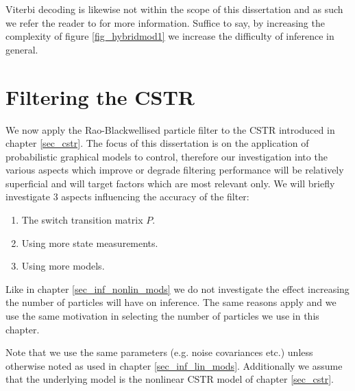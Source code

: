 Viterbi decoding is likewise not within the scope of this dissertation and as such we refer the reader to \cite{murphy1} for more information. Suffice to say, by increasing the complexity of figure \ref{fig_hybridmod1} we increase the difficulty of inference in general.

\section{Filtering the CSTR}
\label{sec_rbpf_filtering_cstr}
We now apply the Rao-Blackwellised particle filter to the CSTR introduced in chapter \ref{sec_cstr}. The focus of this dissertation is on the application of probabilistic graphical models to control, therefore our investigation into the various aspects which improve or degrade filtering performance will be relatively superficial and will target factors which are most relevant only. We will briefly investigate 3 aspects influencing the accuracy of the filter:
\begin{enumerate}
\item
The switch transition matrix $P$.
\item
Using more state measurements.
\item
Using more models.
\end{enumerate}
Like in chapter \ref{sec_inf_nonlin_mods} we do not investigate the effect increasing the number of particles will have on inference. The same reasons apply and we use the same motivation in selecting the number of particles we use in this chapter.

Note that we use the same parameters (e.g. noise covariances etc.) unless otherwise noted as used in chapter \ref{sec_inf_lin_mods}. Additionally we assume that the underlying model is the nonlinear CSTR model of chapter \ref{sec_cstr}.

